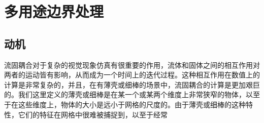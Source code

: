 \chapter{多用途边界处理}

\section{动机}
流固耦合对于复杂的视觉现象仿真有很重要的作用，流体和固体之间的相互作用对两者的运动皆有影响，从而成为一个时间上的迭代过程。这种相互作用在数值上的计算是非常复杂的，并且，在有薄壳或细棒的场景中，流固耦合的计算是更加艰巨的。我们这里定义的薄壳或细棒是在某一个或某两个维度上非常狭窄的物体，以至于在这些维度上，物体的大小是远小于网格的尺度的。由于薄壳或细棒的这种特性，它们的特征在网格中很难被捕捉到，以至于经常



